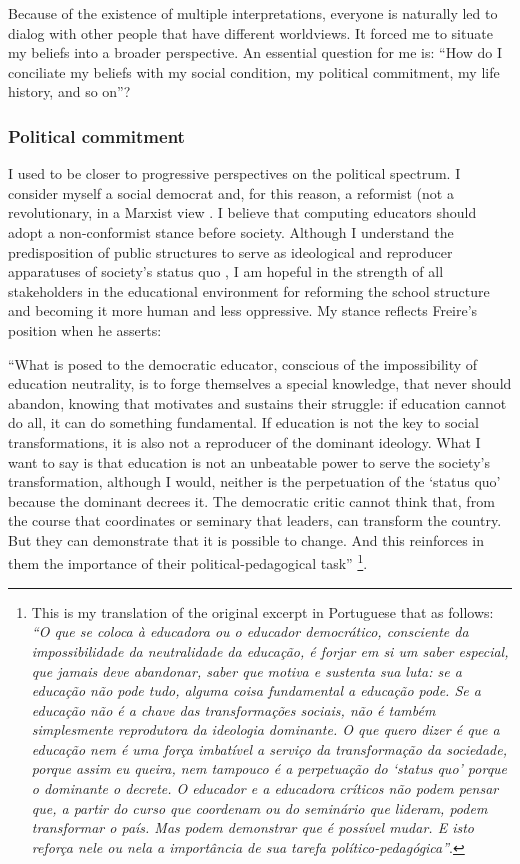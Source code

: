 Because of the existence of multiple interpretations, everyone is naturally led to dialog with other people that have different worldviews. It forced me to situate my beliefs into a broader perspective. An essential question for me is: “How do I conciliate my beliefs with my social condition, my political commitment, my life history, and so on”?

\subsubsection{Political commitment}

I used to be closer to progressive perspectives on the political spectrum. I consider myself a social democrat and, for this reason, a reformist (not a revolutionary, in a Marxist view \cite{schaff:1973}. I believe that computing educators should adopt a non-conformist stance before society. Although I understand the predisposition of public structures to serve as ideological and reproducer apparatuses of society’s status quo \cite{bourdieu:1989}, I am hopeful in the strength of all stakeholders in the educational environment for reforming the school structure and becoming it more human and less oppressive. My stance reflects Freire's position when he asserts:
\begin{citacao}
    “What is posed to the democratic educator, conscious of the impossibility of education neutrality, is to forge themselves a special knowledge, that never should abandon, knowing that motivates and sustains their struggle: if education cannot do all, it can do something fundamental. If education is not the key to social transformations, it is also not a reproducer of the dominant ideology. What I want to say is that education is not an unbeatable power to serve the society's transformation, although I would, neither is the perpetuation of the ‘status quo’ because the dominant decrees it. The democratic critic cannot think that, from the course that coordinates or seminary that leaders, can transform the country. But they can demonstrate that it is possible to change. And this reinforces in them the importance of their political-pedagogical task” \cite{freire:1996-ped-aut}\footnote{This is my translation of the original excerpt in Portuguese that as follows: \textit{“O que se coloca à educadora ou o educador democrático, consciente da impossibilidade da neutralidade da educação, é forjar em si um saber especial, que jamais deve abandonar, saber que motiva e sustenta sua luta: se a educação não pode tudo, alguma coisa fundamental a educação pode. Se a educação não é a chave das transformações sociais, não é também simplesmente reprodutora da ideologia dominante. O que quero dizer é que a educação nem é uma força imbatível a serviço da transformação da sociedade, porque assim eu queira, nem tampouco é a perpetuação do ‘status quo’ porque o dominante o decrete. O educador e a educadora críticos não podem pensar que, a partir do curso que coordenam ou do seminário que lideram, podem transformar o país. Mas podem demonstrar que é possível mudar. E isto reforça nele ou nela a importância de sua tarefa político-pedagógica”}.}.
\end{citacao}
